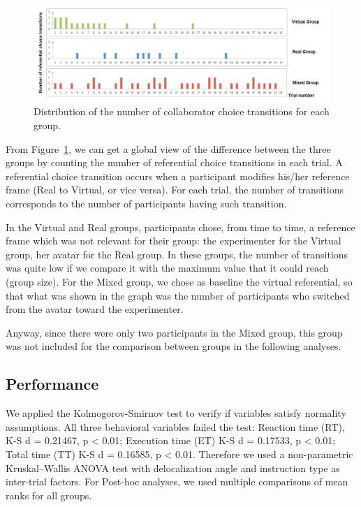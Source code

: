 \begin{figure}[htb]
  \centering
  \includegraphics[width=\textwidth]{figures/ch3/transition}
  \caption{\label{fig:3_transition}Distribution of the number of collaborator choice transitions for each group.}
\end{figure}

From Figure~\ref{fig:3_transition}, we can get a global view of the difference between the three groups by counting the number of referential choice transitions in each trial. A referential choice transition occurs when a participant modifies his/her reference frame (Real to Virtual, or vice versa). For each trial, the number of transitions corresponds to the number of participants having such transition.

In the Virtual and Real groups, participants chose, from time to time, a reference frame which was not relevant for their group: the experimenter for the Virtual group, her avatar for the Real group. In these groups, the number of transitions was quite low if we compare it with the maximum value that it could reach (group size). For the Mixed group, we chose as baseline the virtual referential, so that what was shown in the graph was the number of participants who switched from the avatar toward the experimenter.

Anyway, since there were only two participants in the Mixed group, this group was not included for the comparison between groups in the following analyses.

\subsection{Performance}
We applied the Kolmogorov-Smirnov test to verify if variables satisfy normality assumptions. All three behavioral variables failed the test: Reaction time (RT), K-S d = 0.21467, p \textless{} 0.01; Execution time (ET) K-S d = 0.17533, p \textless{} 0.01; Total time (TT) K-S d = 0.16585, p \textless{} 0.01. Therefore we used a non-parametric Kruskal–Wallis ANOVA test with delocalization angle and instruction type as inter-trial factors. For Post-hoc analyses, we used multiple comparisons of mean ranks for all groups.

